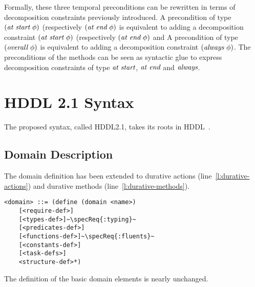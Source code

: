 \documentclass[letterpaper]{article} %
\newcommand{\atstart}{\text{\it at start}}
\newcommand{\atend}{\text{\it at end}}
\newcommand{\always}{\text{\it always}}
\newcommand{\overall}{\text{\it overall}}
\begin{document}
Formally, these three temporal preconditions can be rewritten in terms of decomposition constraints previously introduced. A precondition of type $(\atstart \ \phi)$ (respectively $(\atend \ \phi)$ is equivalent to adding a decomposition constraint $(\atstart \ \phi)$ (respectively $(\atend \ \phi)$ and A precondition of type $(\overall \ \phi)$ is equivalent to adding a decomposition constraint $(\always \ \phi)$. The preconditions of the methods can be seen as syntactic glue to express decomposition constraints of type $\atstart$, $\atend$ and $\always$.

\section{HDDL 2.1 Syntax} 

The proposed syntax, called HDDL2.1, takes its roots in HDDL~\citep{holler20}.

\subsection{Domain Description}

\newcommand{\specReq}[1]{\ensuremath{\mathtt{^{#1}}}}

The domain definition has been extended to durative actions (line~\ref{l:durative-actions}) and durative methods (line~\ref{l:durative-methods}).
\begin{lstlisting}[escapechar=~]
<domain> ::= (define (domain <name>)
    [<require-def>]
    [<types-def>]~\specReq{:typing}~
    [<predicates-def>]
    [<functions-def>]~\specReq{:fluents}~
    [<constants-def>]
    [<task-defs>]
    <structure-def>*)
\end{lstlisting}

%
%
%

\noindent The definition of the basic domain elements is nearly unchanged.
\end{document}
